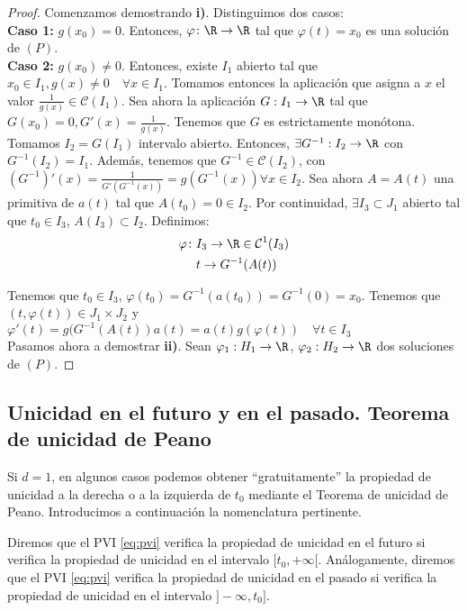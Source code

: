 \documentclass{article}
\begin{document}
\begin{proof}
  Comenzamos demostrando \textbf{i)}. Distinguimos dos casos:\\

  \textbf{Caso 1:} $g(x_0) = 0$. Entonces, $\varphi \colon \R \to \R$ tal que
  $\varphi(t) = x_0$ es una solución de $(P)$.\\

  \textbf{Caso 2:} $g(x_0) \neq 0$. Entonces, existe $I_1$ abierto tal que
  $x_0 \in I_1, g(x) \neq 0 \quad \forall x \in I_1$. Tomamos entonces la aplicación que asigna a
  $x$ el valor $\frac{1}{g(x)} \in \mathcal{C}(I_1)$.  Sea ahora la aplicación $ G: I_1 \to \R$ tal
  que $G(x_0) = 0, G'(x) = \frac{1}{g(x)}$.  Tenemos que $G$ es estrictamente monótona. Tomamos
  $I_2 = G(I_1)$ intervalo abierto. Entonces, $\exists G^{-1}: I_2 \to \R$ con $G^{-1}(I_2) =
  I_1$. Además, tenemos que $G^{-1} \in \mathcal{C}(I_2)$, con
  $(G^{-1})' (x) = \frac{1}{G'(G^{-1}(x))} = g(G^{-1}(x)) \forall x \in I_2$.  Sea ahora $A = A(t)$
  una primitiva de $a(t)$ tal que $A(t_0) = 0 \in I_2$.  Por continuidad, $\exists I_3 \subset J_1$
  abierto tal que $t_0 \in I_3$, $A(I_3) \subset I_2$. Definimos:
  \begin{align*}
    \varphi \colon & I_3 \to \R \in \mathcal{C}^1(I_3) \\
              & t \to G^{-1}(A(t))
  \end{align*}

  Tenemos que $t_0 \in I_3$, $\varphi(t_0) = G^{-1}(a(t_0)) = G^{-1}(0) = x_0$. Tenemos que
  $(t, \varphi(t)) \in J_1 \times J_2$ y
  $\varphi'(t) = g(G^{-1}(A(t))a(t) = a(t)g(\varphi(t)) \quad \forall
  t \in I_3$ \\

  Pasamos ahora a demostrar \textbf{ii)}. Sean $\varphi_1: H_1 \to \R$, $\varphi_2: H_2 \to \R$ dos
  soluciones de $(P)$.
\end{proof}

\subsection{Unicidad en el futuro y en el pasado. Teorema de unicidad de Peano}

Si $d = 1$, en algunos casos podemos obtener ``gratuitamente'' la propiedad de unicidad a la derecha
o a la izquierda de $t_0$ mediante el Teorema de unicidad de Peano. Introducimos a continuación la
nomenclatura pertinente.

\begin{definition}
  \label{def:unicidad-futuro}
  Diremos que el PVI \eqref{eq:pvi} verifica la propiedad de unicidad en el futuro si verifica la
  propiedad de unicidad en el intervalo $[t_0, +\infty[$. Análogamente, diremos que el PVI
  \eqref{eq:pvi} verifica la propiedad de unicidad en el pasado si verifica la propiedad de unicidad
  en el intervalo $]-\infty, t_0]$.
\end{definition}
\end{document}
